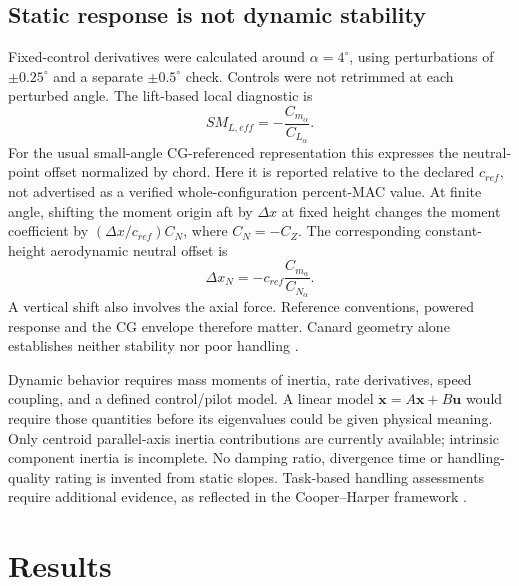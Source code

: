 \documentclass[11pt,a4paper]{article}
\begin{document}
\subsection{Static response is not dynamic stability}
Fixed-control derivatives were calculated around $\alpha=4^\circ$, using perturbations of $\pm0.25^\circ$ and a separate $\pm0.5^\circ$ check. Controls were not retrimmed at each perturbed angle. The lift-based local diagnostic is
\begin{equation}
SM_{L,eff}=-\frac{C_{m_\alpha}}{C_{L_\alpha}}.
\label{eq:sm}
\end{equation}
For the usual small-angle CG-referenced representation this expresses the neutral-point offset normalized by chord. Here it is reported relative to the declared $c_{ref}$, not advertised as a verified whole-configuration percent-MAC value. At finite angle, shifting the moment origin aft by $\Delta x$ at fixed height changes the moment coefficient by $(\Delta x/c_{ref})C_N$, where $C_N=-C_Z$. The corresponding constant-height aerodynamic neutral offset is
\begin{equation}
\Delta x_N=-c_{ref}\frac{C_{m_\alpha}}{C_{N_\alpha}}.
\label{eq:neutral}
\end{equation}
A vertical shift also involves the axial force. Reference conventions, powered response and the CG envelope therefore matter. Canard geometry alone establishes neither stability nor poor handling \cite{ref15}.

Dynamic behavior requires mass moments of inertia, rate derivatives, speed coupling, and a defined control/pilot model. A linear model $\dot{\boldsymbol x}=A\boldsymbol x+B\boldsymbol u$ would require those quantities before its eigenvalues could be given physical meaning. Only centroid parallel-axis inertia contributions are currently available; intrinsic component inertia is incomplete. No damping ratio, divergence time or handling-quality rating is invented from static slopes. Task-based handling assessments require additional evidence, as reflected in the Cooper--Harper framework \cite{ref23}.

\section{Results}
\end{document}
